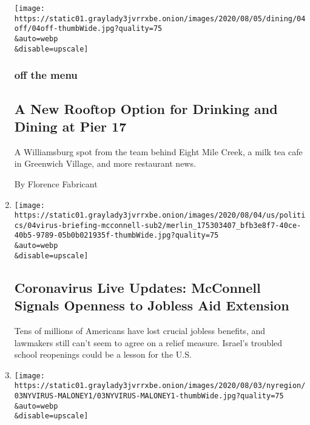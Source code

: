 \begin{enumerate}
  \texttt{[image: https://static01.graylady3jvrrxbe.onion/images/2020/08/05/dining/04off/04off-thumbWide.jpg?quality=75\\\&auto=webp\\\&disable=upscale]}

  \hypertarget{off-the-menu}{%
  \subsubsection{off the menu}\label{off-the-menu}}

  \hypertarget{a-new-rooftop-option-for-drinking-and-dining-at-pier-17}{%
  \subsection{A New Rooftop Option for Drinking and Dining at Pier
  17}\label{a-new-rooftop-option-for-drinking-and-dining-at-pier-17}}

  A Williamsburg spot from the team behind Eight Mile Creek, a milk tea
  cafe in Greenwich Village, and more restaurant news.

  By Florence Fabricant
\item
  \href{/2020/08/04/world/coronavirus-cases.html}{}

  \texttt{[image: https://static01.graylady3jvrrxbe.onion/images/2020/08/04/us/politics/04virus-briefing-mcconnell-sub2/merlin\_175303407\_bfb3e8f7-40ce-40b5-9789-05b0b021935f-thumbWide.jpg?quality=75\\\&auto=webp\\\&disable=upscale]}

  \hypertarget{coronavirus-live-updates-mcconnell-signals-openness-to-jobless-aid-extension}{%
  \subsection{Coronavirus Live Updates: McConnell Signals Openness to
  Jobless Aid
  Extension}\label{coronavirus-live-updates-mcconnell-signals-openness-to-jobless-aid-extension}}

  Tens of millions of Americans have lost crucial jobless benefits, and
  lawmakers still can't seem to agree on a relief measure. Israel's
  troubled school reopenings could be a lesson for the U.S.
\item
  \href{/2020/08/03/nyregion/nyc-congress-carolyn-maloney-ballots.html}{}

  \texttt{[image: https://static01.graylady3jvrrxbe.onion/images/2020/08/03/nyregion/03NYVIRUS-MALONEY1/03NYVIRUS-MALONEY1-thumbWide.jpg?quality=75\\\&auto=webp\\\&disable=upscale]}

  \hypertarget{disputed-ballots-must-be-counted-in-ny-congressional-race-us-judge-rules}{%
}
\end{enumerate}
